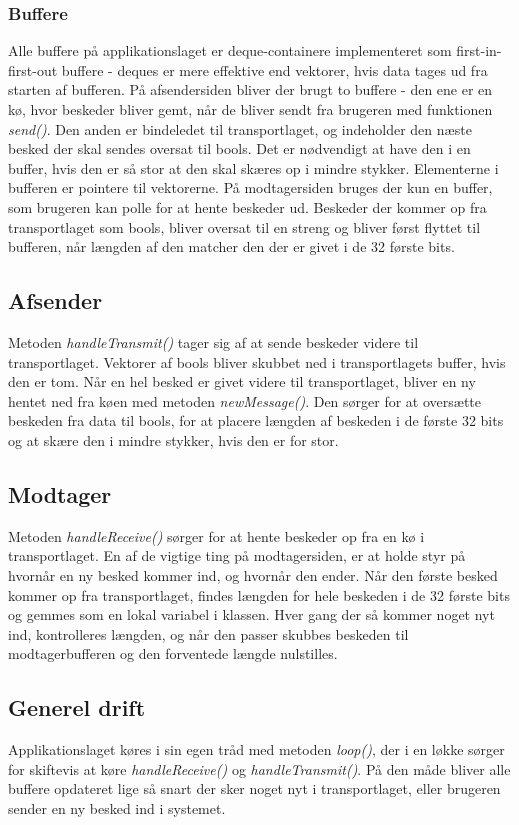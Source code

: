 \subsubsection{Buffere}
Alle buffere på applikationslaget er deque-containere implementeret som first-in-first-out buffere - deques er mere effektive end vektorer, hvis data tages ud fra starten af bufferen. På afsendersiden bliver der brugt to buffere - den ene er en kø, hvor beskeder bliver gemt, når de bliver sendt fra brugeren med funktionen \textit{send()}. Den anden er bindeledet til transportlaget, og indeholder den næste besked der skal sendes oversat til bools. Det er nødvendigt at have den i en buffer, hvis den er så stor at den skal skæres op i mindre stykker. Elementerne i bufferen er pointere til vektorerne. På modtagersiden bruges der kun en buffer, som brugeren kan polle for at hente beskeder ud. Beskeder der kommer op fra transportlaget som bools, bliver oversat til en streng og bliver først flyttet til bufferen, når længden af den matcher den der er givet i de 32 første bits.

\subsection{Afsender}
Metoden \textit{handleTransmit()} tager sig af at sende beskeder videre til transportlaget. Vektorer af bools bliver skubbet ned i transportlagets buffer, hvis den er tom. Når en hel besked er givet videre til transportlaget, bliver en ny hentet ned fra køen med metoden \textit{newMessage()}. Den sørger for at oversætte beskeden fra data til bools, for at placere længden af beskeden i de første 32 bits og at skære den i mindre stykker, hvis den er for stor.

\subsection{Modtager}
Metoden \textit{handleReceive()} sørger for at hente beskeder op fra en kø i transportlaget. En af de vigtige ting på modtagersiden, er at holde styr på hvornår en ny besked kommer ind, og hvornår den ender. Når den første besked kommer op fra transportlaget, findes længden for hele beskeden i de 32 første bits og gemmes som en lokal variabel i klassen. Hver gang der så kommer noget nyt ind, kontrolleres længden, og når den passer skubbes beskeden til modtagerbufferen og den forventede længde nulstilles. 

\subsection{Generel drift}
Applikationslaget køres i sin egen tråd med metoden \textit{loop()}, der i en løkke sørger for skiftevis at køre \textit{handleReceive()} og \textit{handleTransmit()}. På den måde bliver alle buffere opdateret lige så snart  der sker noget nyt i transportlaget, eller brugeren sender en ny besked ind i systemet.